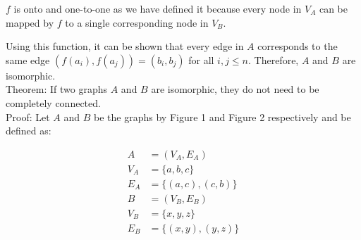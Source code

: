 \documentclass{article}
\begin{document}
$f$ is onto and one-to-one as we have defined it because every node in $V_A$ can be mapped by $f$ to a single corresponding node in $V_B$.

Using this function, it can be shown that every edge in $A$ corresponds to the same edge $(f(a_i), f(a_j)) = (b_i, b_j)$ for all $i, j \leq n$. Therefore, $A$ and $B$ are isomorphic. \\



Theorem: If two graphs $A$ and $B$ are isomorphic, they do not need to be completely connected. \\

Proof: Let $A$ and $B$ be the graphs by Figure 1 and Figure 2 respectively and be defined as: 

\begin{align*}
    A &= (V_A, E_A) \\
    V_A &= \{a, b, c\} \\
    E_A &= \{(a, c), (c, b)\} \\
    B &= (V_B, E_B) \\
    V_B &= \{x, y, z\} \\
    E_B &= \{(x, y), (y, z)\}
\end{align*}
\end{document}
